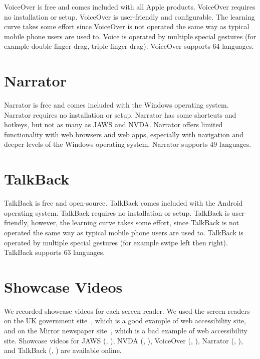 VoiceOver is free and comes included with all Apple products. VoiceOver requires no installation or setup. VoiceOver is user-friendly and configurable. The learning curve takes some effort since VoiceOver is not operated the same way as typical mobile phone users are used to. Voice is operated by multiple special gestures (for example double finger drag, triple finger drag). VoiceOver supports 64 languages.

\section{Narrator}

Narrator is free and comes included with the Windows operating system. Narrator requires no installation or setup. Narrator has some shortcuts and hotkeys, but not as many as JAWS and NVDA. Narrator offers limited functionality with web  browsers and web apps, especially with navigation and deeper levels of the Windows operating system. Narrator supports 49 languages.

\section{TalkBack}

TalkBack is free and open-source. TalkBack comes included with the Android operating system. TalkBack requires no installation or setup. TalkBack is user-friendly, however, the learning curve takes some effort, since TalkBack is not operated the same way as typical mobile phone users are used to. TalkBack is operated by multiple special gestures (for example swipe left then right). TalkBack supports 63 languages.

\section{Showcase Videos}
We recorded showcase videos for each screen reader. We used the screen readers on the UK government site~\parencite{GovUK}, which is a good example of web accessibility site, and on the Mirror newspaper site~\parencite{MirrorUK}, which is a bad example of web accessibility site.
Showcase videos for JAWS (\parencite{JAWS_gov}, \parencite{JAWS_mirror}), NVDA (\parencite{NVDA_gov}, \parencite{NVDA_mirror}), VoiceOver (\parencite{VoiceOver_gov}, \parencite{VoiceOver_mirror}), Narrator (\parencite{Narrator_gov}, \parencite{Narrator_mirror}), and TalkBack (\parencite{TalkBack_gov}, \parencite{TalkBack_mirror}) are available online.

